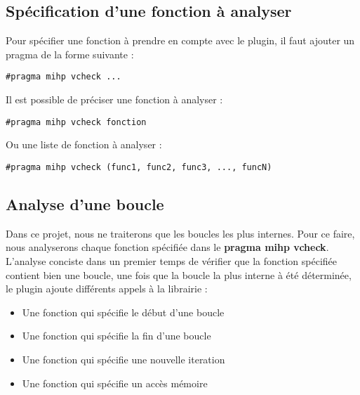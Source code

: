 \documentclass[12pt,french]{article}
\begin{document}
	\subsection{\color{blue}Spécification d'une fonction à analyser}

Pour spécifier une fonction à prendre en compte avec le plugin, il faut ajouter un pragma de la forme suivante :

\begin{center}
\color{green}
\begin{lstlisting}
#pragma mihp vcheck ...
\end{lstlisting}
\end{center}

Il est possible de préciser une fonction à analyser :

\begin{center}
\color{green}
\begin{lstlisting}
#pragma mihp vcheck fonction
\end{lstlisting}
\end{center}

Ou une liste de fonction à analyser :

\begin{center}
\color{green}
\begin{lstlisting}
#pragma mihp vcheck (func1, func2, func3, ..., funcN)
\end{lstlisting}
\end{center}

	\subsection{\color{blue}Analyse d'une boucle}

Dans ce projet, nous ne traiterons que les boucles les plus internes. Pour ce faire, nous analyserons chaque fonction spécifiée dans le \textbf{pragma mihp vcheck}. L'analyse conciste dans un premier temps de vérifier que la fonction spécifiée contient bien une boucle, une fois que la boucle la plus interne à été déterminée, le plugin ajoute différents appels à la librairie :
\vspace{0.5cm}
\begin{itemize}
\item Une fonction qui spécifie le début d'une boucle
\item Une fonction qui spécifie la fin d'une boucle
\item Une fonction qui spécifie une nouvelle iteration
\item Une fonction qui spécifie un accès mémoire
\end{itemize}
\vspace{0.5cm}
\end{document}
